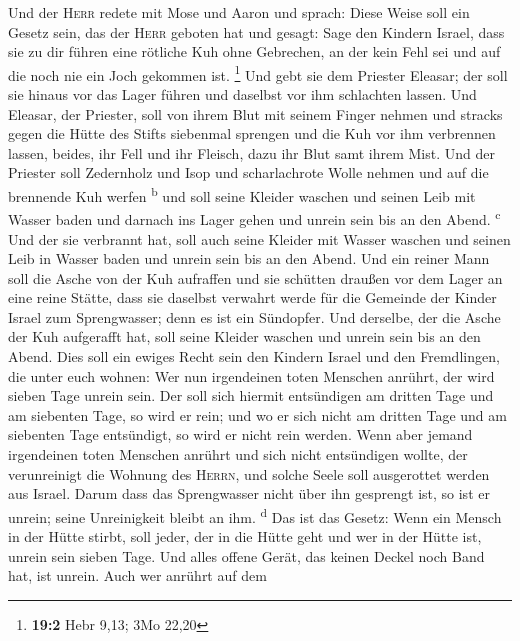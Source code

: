  Und der \textsc{Herr} redete mit Mose und Aaron und
sprach:  Diese Weise soll ein Gesetz sein, das der
\textsc{Herr} geboten hat und gesagt: Sage den Kindern Israel, dass sie
zu dir führen eine rötliche Kuh ohne Gebrechen, an der kein Fehl sei und
auf die noch nie ein Joch gekommen ist. \footnote{\textbf{19:2} Hebr
  9,13; 3Mo 22,20}  Und gebt sie dem Priester Eleasar; der
soll sie hinaus vor das Lager führen und daselbst vor ihm schlachten
lassen.  Und Eleasar, der Priester, soll von ihrem Blut
mit seinem Finger nehmen und stracks gegen die Hütte des Stifts
siebenmal sprengen  und die Kuh vor ihm verbrennen lassen,
beides, ihr Fell und ihr Fleisch, dazu ihr Blut samt ihrem Mist.
 Und der Priester soll Zedernholz und Isop und
scharlachrote Wolle nehmen und auf die brennende Kuh werfen
\textsuperscript{b}  und soll seine Kleider waschen und
seinen Leib mit Wasser baden und darnach ins Lager gehen und unrein sein
bis an den Abend. \textsuperscript{c}  Und der sie
verbrannt hat, soll auch seine Kleider mit Wasser waschen und seinen
Leib in Wasser baden und unrein sein bis an den Abend. 
Und ein reiner Mann soll die Asche von der Kuh aufraffen und sie
schütten draußen vor dem Lager an eine reine Stätte, dass sie daselbst
verwahrt werde für die Gemeinde der Kinder Israel zum Sprengwasser; denn
es ist ein Sündopfer.  Und derselbe, der die Asche der
Kuh aufgerafft hat, soll seine Kleider waschen und unrein sein bis an
den Abend. Dies soll ein ewiges Recht sein den Kindern Israel und den
Fremdlingen, die unter euch wohnen:  Wer nun irgendeinen
toten Menschen anrührt, der wird sieben Tage unrein sein.
 Der soll sich hiermit entsündigen am dritten Tage und am
siebenten Tage, so wird er rein; und wo er sich nicht am dritten Tage
und am siebenten Tage entsündigt, so wird er nicht rein werden.
 Wenn aber jemand irgendeinen toten Menschen anrührt und
sich nicht entsündigen wollte, der verunreinigt die Wohnung des
\textsc{Herrn}, und solche Seele soll ausgerottet werden aus Israel.
Darum dass das Sprengwasser nicht über ihn gesprengt ist, so ist er
unrein; seine Unreinigkeit bleibt an ihm. \textsuperscript{d}
 Das ist das Gesetz: Wenn ein Mensch in der Hütte stirbt,
soll jeder, der in die Hütte geht und wer in der Hütte ist, unrein sein
sieben Tage.  Und alles offene Gerät, das keinen Deckel
noch Band hat, ist unrein.  Auch wer anrührt auf dem

